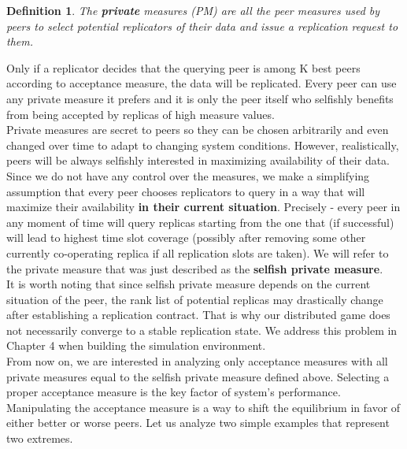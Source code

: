 \documentclass{pracamgren}
\newcounter{collective_ctr} \numberwithin{collective_ctr}{chapter}
\newtheorem{definition}[collective_ctr]{Definition}
\begin{document}
\begin{definition}
The {\bf private} measures (PM) are all the peer measures used by peers to select potential replicators of their data and issue a replication request to them.
\end{definition}

Only if a replicator decides that the querying peer is among K best peers according to acceptance measure, the data will be replicated. Every peer can use any private measure it prefers and it is only the peer itself who selfishly benefits from being accepted by replicas of high measure values.\\

Private measures are secret to peers so they can be chosen arbitrarily and even changed over time to adapt to changing system conditions. However, realistically, peers will be always selfishly interested in maximizing availability of their data. Since we do not have any control over the measures, we make a simplifying assumption that every peer chooses replicators to query in a way that will maximize their availability {\bf in their current situation}. Precisely - every peer in any moment of time will query replicas starting from the one that (if successful) will lead to highest time slot coverage (possibly after removing some other currently co-operating replica if all replication slots are taken). We will refer to the private measure that was just described as the {\bf selfish private measure}.\\

It is worth noting that since selfish private measure depends on the current situation of the peer, the rank list of potential replicas may drastically change after establishing a replication contract. That is why our distributed game does not necessarily converge to a stable replication state. We address this problem in Chapter 4 when building the simulation environment.\\

From now on, we are interested in analyzing only acceptance measures with all private measures equal to the selfish private measure defined above. Selecting a proper acceptance measure is the key factor of system's performance. Manipulating the acceptance measure is a way to shift the equilibrium in favor of either better or worse peers. Let us analyze two simple examples that represent two extremes.\\

\end{document}
